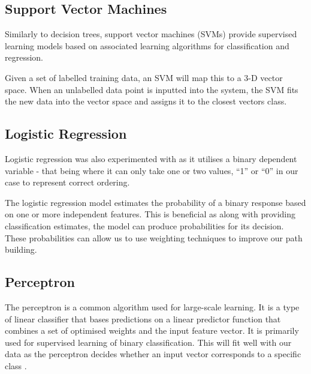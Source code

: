 \documentclass[bsc,frontabs,twoside,singlespacing,parskip,deptreport]{infthesis}     %
\begin{document}

\subsection{Support Vector Machines}
Similarly to decision trees, support vector machines (SVMs) provide supervised learning models based on
associated learning algorithms for classification and regression.

Given a set of labelled training data, an SVM will map this to a 3-D vector space.
When an unlabelled data point is inputted into the system, the SVM fits the new data into the vector space and
assigns  it to the closest vectors class.

\subsection{Logistic Regression}
Logistic regression was also experimented with as it utilises a binary dependent variable - that being where it
can only take one or two values, ``1'' or ``0'' in our case to represent correct ordering.


The logistic regression model estimates the probability of a binary response based on one or more independent features.
This is beneficial as along with providing classification estimates, the model can produce probabilities for its
decision. These probabilities can allow us to use weighting techniques to improve our path building.

\subsection{Perceptron}
The perceptron is a common algorithm used for large-scale learning.
It is a type of linear classifier that bases predictions on a linear predictor function that combines a set of optimised weights
and the input feature vector.
It is primarily used for supervised learning of binary classification.
This will fit well with our data as the perceptron decides whether an input vector
corresponds to a specific class \cite{freund1999large}.
\end{document}
